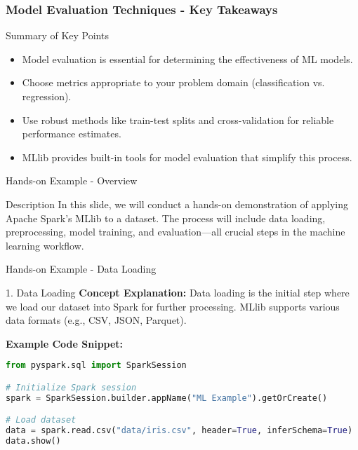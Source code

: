 \documentclass[aspectratio=169]{beamer}
\begin{document}
\begin{frame}[fragile]
    \frametitle{Model Evaluation Techniques - Key Takeaways}
    \begin{block}{Summary of Key Points}
        \begin{itemize}
            \item Model evaluation is essential for determining the effectiveness of ML models.
            \item Choose metrics appropriate to your problem domain (classification vs. regression).
            \item Use robust methods like train-test splits and cross-validation for reliable performance estimates.
            \item MLlib provides built-in tools for model evaluation that simplify this process.
        \end{itemize}
    \end{block}
\end{frame}

\begin{frame}[fragile]{Hands-on Example - Overview}
    \begin{block}{Description}
        In this slide, we will conduct a hands-on demonstration of applying Apache Spark's MLlib to a dataset. The process will include data loading, preprocessing, model training, and evaluation—all crucial steps in the machine learning workflow.
    \end{block}
\end{frame}

\begin{frame}[fragile]{Hands-on Example - Data Loading}
    \begin{block}{1. Data Loading}
        \textbf{Concept Explanation:} 
        Data loading is the initial step where we load our dataset into Spark for further processing. 
        MLlib supports various data formats (e.g., CSV, JSON, Parquet).
        
        \textbf{Example Code Snippet:}
    \end{block}
    
    \begin{lstlisting}[language=python]
from pyspark.sql import SparkSession

# Initialize Spark session
spark = SparkSession.builder.appName("ML Example").getOrCreate()

# Load dataset
data = spark.read.csv("data/iris.csv", header=True, inferSchema=True)
data.show()
    \end{lstlisting}
\end{frame}
\end{document}
